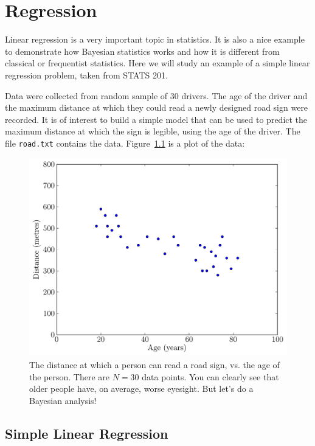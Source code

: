 \chapter{Regression}
Linear regression is a very important topic in statistics. It is also a nice
example to demonstrate how Bayesian statistics works and how it is different
from classical or frequentist statistics. Here we will study an example of a simple linear
regression problem, taken from STATS 201.

Data were collected from random sample of 30 drivers. The age of the driver and the 
maximum distance at which they could read a newly designed road sign were 
recorded. It is of interest to build a simple model that can be used to predict the 
maximum distance at which the sign is legible, using the age of the driver. The file 
{\tt road.txt} contains the data. Figure~\ref{fig:road} is a plot of the data:
\begin{figure}
\begin{center}
\includegraphics[scale=0.5]{Figures/road.pdf}
\caption{The distance at which a person can read a road sign, vs. the age of
the person. There are $N=30$ data points. You can clearly see that older people
have, on average, worse eyesight. But let's do a Bayesian analysis!\label{fig:road}}
\end{center}
\end{figure}

\section{Simple Linear Regression}


